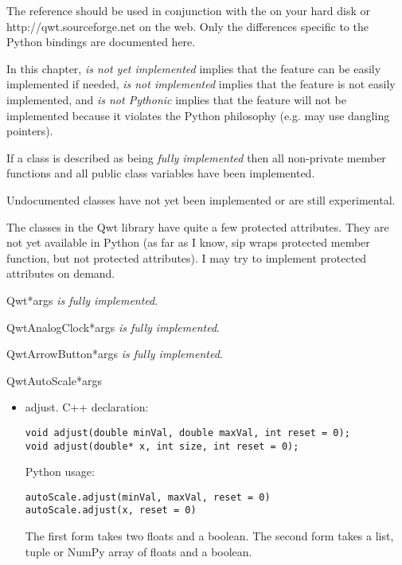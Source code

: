 \documentclass{manual}
\newcommand{\Qwt}{\ulink{Qwt}
  {http://qwt.sourceforge.net}}
\begin{document}
The reference should be used in conjunction with the
 on your hard disk or \Qwt{} on the web.
Only the differences specific to the Python bindings are documented here.

In this chapter, \emph{is not yet implemented} implies that the feature can
be easily implemented if needed, \emph{is not implemented} implies that the
feature is not easily implemented, and \emph{is not Pythonic} implies that
the feature will not be implemented because it violates the Python philosophy
(e.g. may use dangling pointers).

If a class is described as being \emph{fully implemented} then all non-private
member functions and all public class variables have been implemented.

Undocumented classes have not yet been implemented or are still experimental.

The classes in the Qwt library have quite a few protected attributes.
They are not yet available in Python (as far as I know, sip wraps
protected member function, but not protected attributes).
I may try to implement protected attributes on demand.

\begin{classdesc}{Qwt}{*args}
\emph{is fully implemented}.
\end{classdesc}

\begin{classdesc}{QwtAnalogClock}{*args}
\emph{is fully implemented}.
\end{classdesc}

\begin{classdesc}{QwtArrowButton}{*args}
\emph{is fully implemented}.
\end{classdesc}

\begin{classdesc}{QwtAutoScale}{*args}

  \begin{itemize}
  
    \item{adjust}. C++ declaration:
      \begin{verbatim}
void adjust(double minVal, double maxVal, int reset = 0);
void adjust(double* x, int size, int reset = 0);
      \end{verbatim}
      Python usage:
      \begin{verbatim}
autoScale.adjust(minVal, maxVal, reset = 0)
autoScale.adjust(x, reset = 0)
    \end{verbatim}
      The first form takes two floats and a boolean.
      The second form takes a list, tuple or NumPy array of floats and a
      boolean.

  \end{itemize}
\end{classdesc}
\end{document}
